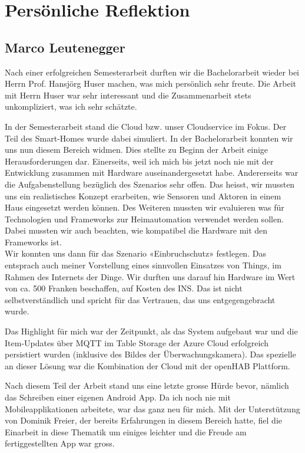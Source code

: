 \pagebreak
\section{Persönliche Reflektion}

\subsection*{Marco Leutenegger}
Nach einer erfolgreichen Semesterarbeit durften wir die Bachelorarbeit wieder bei Herrn Prof. Hansjörg Huser machen, was mich persönlich sehr freute. Die Arbeit mit Herrn Huser war sehr interessant und die Zusammenarbeit stets unkompliziert, was ich sehr schätzte.

In der Semesterarbeit stand die Cloud bzw. unser Cloudservice im Fokus. Der Teil des Smart-Homes wurde dabei simuliert. In der Bachelorarbeit konnten wir uns nun diesem Bereich widmen. Dies stellte zu Beginn der Arbeit einige Herausforderungen dar. Einerseits, weil ich mich bis jetzt noch nie mit der Entwicklung zusammen mit Hardware auseinandergesetzt habe. Andererseits war die Aufgabenstellung bezüglich des Szenarios sehr offen. Das heisst, wir mussten uns ein realistisches Konzept erarbeiten, wie Sensoren und Aktoren in einem Haus eingesetzt werden können. Des Weiteren mussten wir evaluieren was für Technologien und Frameworks zur Heimautomation verwendet werden sollen. Dabei mussten wir auch beachten, wie kompatibel die Hardware mit den Frameworks ist. \\
Wir konnten uns dann für das Szenario «Einbruchschutz» festlegen. Das entsprach auch meiner Vorstellung eines sinnvollen Einsatzes von Things, im Rahmen des Internets der Dinge. Wir durften uns darauf hin Hardware im Wert von ca. 500 Franken beschaffen, auf Kosten des INS. Das ist nicht selbstverständlich und spricht für das Vertrauen, das uns entgegengebracht wurde.

Das Highlight für mich war der Zeitpunkt, als das System aufgebaut war und die Item-Updates über MQTT im Table Storage der Azure Cloud erfolgreich persistiert wurden (inklusive des Bildes der Überwachungskamera). Das spezielle an dieser Lösung war die Kombination der Cloud mit der openHAB Plattform.

Nach diesem Teil der Arbeit stand uns eine letzte grosse Hürde bevor, nämlich das Schreiben einer eigenen Android App. Da ich noch nie mit Mobileapplikationen arbeitete, war das ganz neu für mich. Mit der Unterstützung von Dominik Freier, der bereits Erfahrungen in diesem Bereich hatte, fiel die Einarbeit in diese Thematik um einiges leichter und die Freude am fertiggestellten App war gross.

